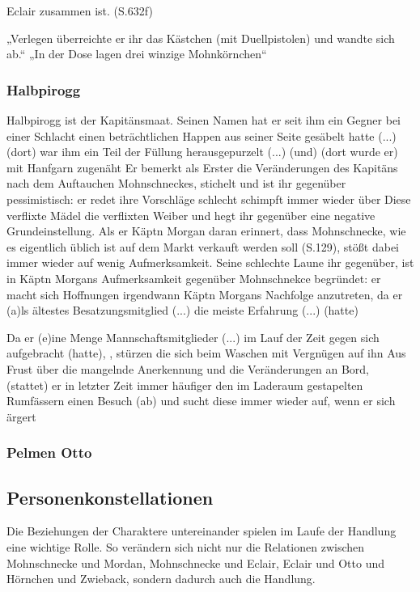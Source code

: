 {Eclair zusammen ist. (S.632f)

„Verlegen überreichte er ihr das Kästchen (mit Duellpistolen) und wandte sich ab.“
„In der Dose lagen drei winzige Mohnkörnchen“

\subsubsection{Halbpirogg}
Halbpirogg ist der Kapitänsmaat. Seinen Namen hat er seit ihm ein Gegner bei einer Schlacht 
einen beträchtlichen Happen aus seiner Seite gesäbelt hatte (...)(dort) 
war ihm ein Teil der Füllung herausgepurzelt (...) 
(und) (dort wurde er) mit Hanfgarn zugenäht\cite[S. 33]{pir}
Er bemerkt als Erster die Veränderungen des Kapitäns nach 
dem Auftauchen Mohnschneckes, stichelt und ist ihr gegenüber pessimistisch:
er redet ihre Vorschläge schlecht \cite[S. 266]{pir} schimpft immer wieder über Diese verflixte Mädel\cite[S. 145]{pir}
die verflixten Weiber \cite[302]{pir}und 
hegt ihr gegenüber eine negative Grundeinstellung. \cite[S. 297]{pir}
Als er Käptn Morgan daran erinnert, dass Mohnschnecke, wie es eigentlich üblich ist \cite[S.50]{pir} 
auf dem Markt verkauft werden soll (S.129), stößt dabei immer wieder auf wenig Aufmerksamkeit. \cite[S. 145]{pir}
Seine schlechte Laune ihr gegenüber, ist in Käptn Morgans Aufmerksamkeit gegenüber Mohnschnekce begründet: er macht
sich Hoffnungen irgendwann Käptn Morgans Nachfolge anzutreten, 
da er (a)ls ältestes Besatzungsmitglied (...) die meiste Erfahrung (...) (hatte)\cite[S.371]{pir}
 
Da er (e)ine Menge Mannschaftsmitglieder  (...) im Lauf der Zeit gegen sich aufgebracht (hatte), \cite[S.151]{pir}, 
stürzen die sich beim Waschen mit Vergnügen auf ihn \cite[S.151]{pir}
Aus Frust über die mangelnde Anerkennung und die Veränderungen an Bord, 
(stattet) er in letzter Zeit immer häufiger den im Laderaum gestapelten Rumfässern 
einen Besuch (ab) \cite[S. 181]{pir} und sucht diese immer wieder auf, wenn er sich ärgert \cite[S. 303]{pir}


\subsubsection{Pelmen Otto}


\subsection {Personenkonstellationen}
Die Beziehungen der Charaktere untereinander spielen im Laufe der Handlung eine wichtige Rolle. So verändern sich nicht nur die Relationen zwischen Mohnschnecke und Mordan, Mohnschnecke und Eclair, Eclair und Otto und Hörnchen und Zwieback, sondern dadurch auch die Handlung.
}
